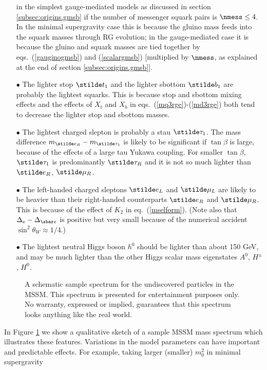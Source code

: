 \begin{itemize}
in the simplest gauge-mediated models as discussed in section
\ref{subsec:origins.gmsb} if the number
of messenger squark pairs is
$\nmess
\leq 4$.
 In the minimal supergravity case this is because the gluino mass feeds
into the squark masses through RG evolution; in the gauge-mediated case it
is because the gluino and squark masses are tied together by
eqs.~(\ref{gauginogmsb}) and (\ref{scalargmsb}) [multiplied by $\nmess$,
as explained at the end of section \ref{subsec:origins.gmsb}].
\item[$\bullet$] The lighter stop $\stilde t_1$ and the lighter
sbottom $\stilde b_1$ are probably the lightest squarks. This is
because stop and sbottom mixing effects and the effects of $X_t$ and
$X_b$ in eqs.~(\ref{mq3rge})-(\ref{md3rge}) both tend to decrease the
lighter stop and sbottom masses.
\item[$\bullet$] The lightest charged slepton is probably
a stau $\stilde
\tau_1$.
The mass difference
$m_{\stilde e_R}-m_{\stilde \tau_1}$ is likely to be significant
if $\tan\beta$
is large, because of the effects of a large tau Yukawa coupling.
For smaller $\tan\beta$, $\stilde \tau_1$ is predominantly $\stilde
\tau_R$
and it is not so much lighter than $\stilde e_R$, $\stilde \mu_R$.
\item[$\bullet$] The left-handed charged sleptons $\stilde e_L$ and
$\stilde \mu_L$ are likely to be heavier than their right-handed
counterparts
$\stilde e_R$ and $\stilde \mu_R$. This is because of the effect of
$K_2$ in eq.~(\ref{mselform}). (Note also that
$\Delta_e - \Delta_{\sbar e}$ is positive
but very small because of the numerical
accident $\sin^2\theta_W \approx 1/4$.)
\item[$\bullet$] The lightest neutral Higgs boson $h^0$
should be lighter than about 150 GeV, and may be much lighter than the
other Higgs scalar mass eigenstates
$A^0$, $H^\pm$, $H^0$.
\end{itemize}
\begin{figure}
\centerline{}
\caption{A schematic sample spectrum for the undiscovered
particles in the MSSM. This spectrum is presented for entertainment
purposes only. No warranty, expressed or implied, guarantees that this
spectrum looks anything like the real world.
\label{fig:sample}}
\end{figure}
In Figure \ref{fig:sample} we show a qualitative sketch
of a sample MSSM mass spectrum which illustrates these features.
Variations in the model parameters can have important and
predictable effects.
For example, taking larger (smaller) $m_0^2$ in minimal supergravity
